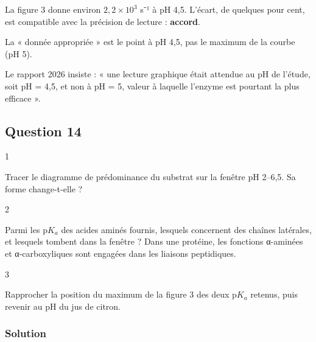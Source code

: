 \documentclass[11pt,a4paper]{article}
\newcommand{\equationajustee}[1]{%
  \sbox{\boiteequation}{$\displaystyle #1$}%
  \ifdim\wd\boiteequation>\linewidth
    \[\resizebox{\linewidth}{!}{\usebox{\boiteequation}}\]%
  \else
    \[#1\]%
  \fi}
\begin{document}
\equationajustee{\mathrm{TON} = \frac{2\times2{,}84\times10^{-4}}{2{,}5\times10^{-7}} = 2{,}3\times10^3\ \mathrm{s^{-1}}}

La figure 3 donne environ \(2{,}2\times10^3\) s⁻¹ à pH 4,5. L'écart, de quelques pour cent, est compatible avec la précision de lecture : \textbf{accord}.

\begin{piege}

La « donnée appropriée » est le point à pH 4,5, pas le maximum de la courbe (pH 5).

\end{piege}

\begin{jury}

Le rapport 2026 insiste : « une lecture graphique était attendue au pH de l'étude, soit pH = 4,5, et non à pH = 5, valeur à laquelle l'enzyme est pourtant la plus efficace ».

\end{jury}

\hypertarget{question-14}{%
\subsection{Question 14}\label{question-14}}

\begin{indication}{1}

Tracer le diagramme de prédominance du substrat sur la fenêtre pH 2--6,5. Sa forme change-t-elle ?

\end{indication}

\begin{indication}{2}

Parmi les p\(K_a\) des acides aminés fournis, lesquels concernent des chaînes latérales, et lesquels tombent dans la fenêtre ? Dans une protéine, les fonctions α-aminées et α-carboxyliques sont engagées dans les liaisons peptidiques.

\end{indication}

\begin{indication}{3}

Rapprocher la position du maximum de la figure 3 des deux p\(K_a\) retenus, puis revenir au pH du jus de citron.

\end{indication}

\hypertarget{solution-13}{%
\subsubsection{Solution}\label{solution-13}}
\end{document}
